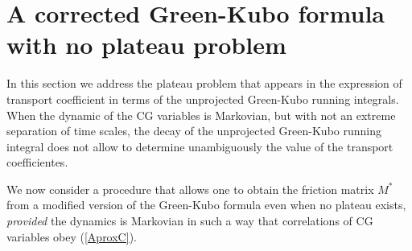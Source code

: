 \documentclass[b5paper,openright,10pt]{book}
\begin{document}
\section{A corrected Green-Kubo formula with no plateau problem}
\label{Sec:GKsi}

In this section we address the plateau problem that appears in the expression of transport coefficient in terms of the unprojected Green-Kubo running integrals. When the dynamic of the CG variables is Markovian, but with not an extreme separation of time scales, the decay of the unprojected Green-Kubo running integral does not allow to determine unambiguously the value of the transport coefficientes. 

We  now consider  a  procedure that  allows one  to  
obtain the  friction matrix  $M^*$
from a modified version of the Green-Kubo formula even when no plateau
exists, \textit{provided} the dynamics 
is  Markovian in  such a  way that
  correlations of CG variables obey (\ref{AproxC}).
\end{document}
